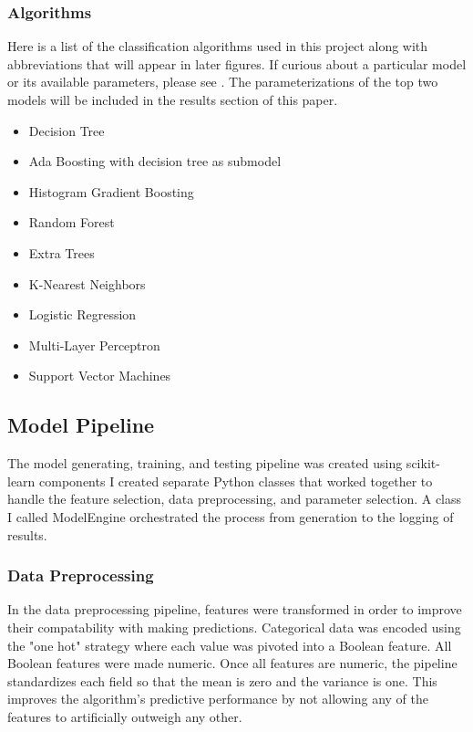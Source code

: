 \documentclass{article}
\begin{document}
            \subsubsection{Algorithms}
                Here is a list of the classification algorithms used in this project along with abbreviations that will appear in later figures. 
                If curious about a particular model or its available parameters, please see \cite{sklearn}.
                The parameterizations of the top two models will be included in the results section of this paper.
                \begin{itemize}
                    \item Decision Tree
                    \item Ada Boosting with decision tree as submodel
                    \item Histogram Gradient Boosting
                    \item Random Forest
                    \item Extra Trees
                    \item K-Nearest Neighbors
                    \item Logistic Regression
                    \item Multi-Layer Perceptron
                    \item Support Vector Machines
                \end{itemize}

        \subsection{Model Pipeline}
            The model generating, training, and testing pipeline was created using scikit-learn components \cite{sklearn} 
            I created separate Python classes that worked together to handle the feature selection, data preprocessing, and parameter selection.
            A class I called ModelEngine orchestrated the process from generation to the logging of results.

            \subsubsection{Data Preprocessing}
                In the data preprocessing pipeline, features were transformed in order to improve their compatability with making predictions.
                Categorical data was encoded using the "one hot" strategy where each value was pivoted into a Boolean feature.    
                All Boolean features were made numeric.
                Once all features are numeric, the pipeline standardizes each field so that the mean is zero and the variance is one.
                This improves the algorithm's predictive performance by not allowing any of the features to artificially outweigh any other.
                
\end{document}
